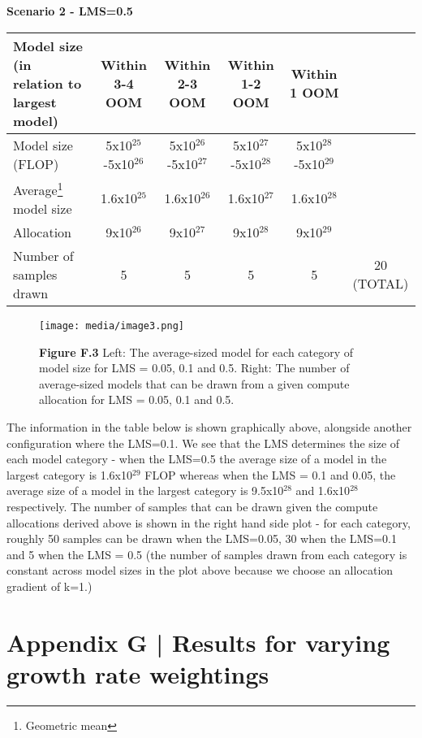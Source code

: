 \documentclass[11pt]{article}
\begin{document}
\textbf{Scenario 2 - LMS=0.5}

\begin{table}[h]
\centering
\begin{tabular}{|l|c|c|c|c|c|}
\hline
Model size (in relation to largest model) & Within 3-4 OOM & Within 2-3 OOM & Within 1-2 OOM & Within 1 OOM & \\
\hline
Model size (FLOP) & 5x10$^{25}$-5x10$^{26}$ & 5x10$^{26}$-5x10$^{27}$ & 5x10$^{27}$-5x10$^{28}$ & 5x10$^{28}$-5x10$^{29}$ & \\
\hline
Average\footnote{Geometric mean} model size & 1.6x10$^{25}$ & 1.6x10$^{26}$ & 1.6x10$^{27}$ & 1.6x10$^{28}$ & \\
\hline
Allocation & 9x10$^{26}$ & 9x10$^{27}$ & 9x10$^{28}$ & 9x10$^{29}$ & \\
\hline
Number of samples drawn & 5 & 5 & 5 & 5 & 20 (TOTAL) \\
\hline
\end{tabular}
\end{table}

\begin{figure}[h]
\centering
\texttt{[image: media/image3.png]}
\caption*{\textbf{Figure F.3} Left: The average-sized model for each category of model size for LMS = 0.05, 0.1 and 0.5. Right: The number of average-sized models that can be drawn from a given compute allocation for LMS = 0.05, 0.1 and 0.5.}
\end{figure}

The information in the table below is shown graphically above, alongside another configuration where the LMS=0.1. We see that the LMS determines the size of each model category - when the LMS=0.5 the average size of a model in the largest category is 1.6x10$^{29}$ FLOP whereas when the LMS = 0.1 and 0.05, the average size of a model in the largest category is 9.5x10$^{28}$ and 1.6x10$^{28}$ respectively. The number of samples that can be drawn given the compute allocations derived above is shown in the right hand side plot - for each category, roughly 50 samples can be drawn when the LMS=0.05, 30 when the LMS=0.1 and 5 when the LMS = 0.5 (the number of samples drawn from each category is constant across model sizes in the plot above because we choose an allocation gradient of k=1.)

\section{Appendix G | Results for varying growth rate weightings}
\label{appendix-g-results-for-varying-growth-rate-weightings}
\end{document}
